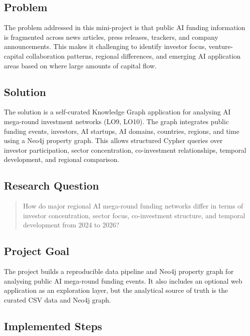 \documentclass[11pt,a4paper]{article}
\begin{document}
\subsection{Problem}

The problem addressed in this mini-project is that public AI funding
information is fragmented across news articles, press releases, trackers, and
company announcements. This makes it challenging to identify investor focus,
venture-capital collaboration patterns, regional differences, and emerging AI
application areas based on where large amounts of capital flow.

\subsection{Solution}

The solution is a self-curated Knowledge Graph application for analysing AI
mega-round investment networks (LO9, LO10). The graph integrates public funding
events, investors, AI startups, AI domains, countries, regions, and time using a
Neo4j property graph. This allows structured Cypher queries over investor
participation, sector concentration, co-investment relationships, temporal
development, and regional comparison.

\subsection{Research Question}

\begin{quote}
How do major regional AI mega-round funding networks differ in terms of investor
concentration, sector focus, co-investment structure, and temporal development
from 2024 to 2026?
\end{quote}

\subsection{Project Goal}

The project builds a reproducible data pipeline and Neo4j property graph for
analysing public AI mega-round funding events. It also includes an optional web
application as an exploration layer, but the analytical source of truth is the
curated CSV data and Neo4j graph.

\subsection{Implemented Steps}
\end{document}
